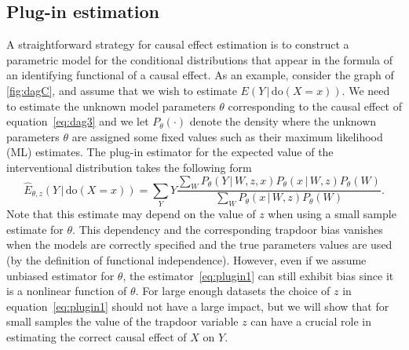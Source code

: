 \documentclass{statsoc}
\newcommand{\+}[1]{\ensuremath{\mathbf{#1}}}
\newcommand{\doo}{\textrm{do}}
\newcommand{\given}{{ \, | \, }}
\newcommand{\z}{trapdoor variable}
\begin{document}
\subsection{Plug-in estimation}
A straightforward strategy for causal effect estimation is to construct a parametric model for the conditional distributions that appear in the formula of an identifying functional of a causal effect. As an example, consider the graph of \autoref{fig:dagC}, and assume that we wish to estimate $E(Y \given \doo(X = x))$. We need to estimate the unknown model parameters $\theta$ corresponding to the causal effect of equation~\eqref{eq:dag3} and we let $P_\theta(\cdot)$ denote the density where the unknown parameters $\theta$ are assigned some fixed values such as their maximum likelihood (ML) estimates. The plug-in estimator for the expected value of the interventional distribution takes the following form
\begin{equation} 
\label{eq:plugin1}
\widehat E_{\theta, z}(Y \given \doo(X = x)) = \sum_{Y} Y \frac{\sum_{W}P_\theta(Y \given W, z, x)P_\theta(x \given  W, z) P_\theta(W)}{\sum_{W}P_\theta(x \given  W, z) P_\theta(W)}.
\end{equation}
Note that this estimate may depend on the value of $z$ when using a small sample estimate for $\theta$. This dependency and the corresponding trapdoor bias vanishes when the models are correctly specified and the true parameters values are used (by the definition of functional independence). However, even if we assume unbiased estimator for $\theta$, the estimator~\eqref{eq:plugin1} can still exhibit bias since it is a nonlinear function of $\theta$. For large enough datasets the choice of $z$ in equation~\eqref{eq:plugin1} should not have a large impact, but we will show that for small samples the value of the \z{} $z$ can have a crucial role in estimating the correct causal effect of $X$ on $Y$. 
\end{document}
